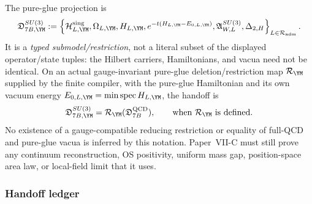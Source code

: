 \documentclass[12pt,a4paper]{article}
\begin{document}
\begin{definition}
\label{p11:def:pure-glue-wilson-curvature-subdatum-paper-xii}
The pure-glue projection is
\begin{equation}
\label{p11:eq:paper-xii-pure-glue-subdatum}
\mathfrak D_{7B,\YM}^{SU(3)}
:=\left\{\mathcal H_{L,\YM}^{\rm sing},\Omega_{L,\YM},H_{L,\YM},e^{-t(H_{L,\YM}-E_{0,L,\YM})},\mathfrak A_{W,L}^{SU(3)},\Delta_{2,H}\right\}_{L\in\mathcal R_{\rm adm}}.
\end{equation}
It is a \emph{typed submodel/restriction}, not a literal subset of the displayed
operator/state tuples: the Hilbert carriers, Hamiltonians, and vacua need not be identical. On an actual gauge-invariant pure-glue deletion/restriction map \(\mathcal R_{\YM}\) supplied by the finite compiler, with the pure-glue Hamiltonian and its own vacuum energy \(E_{0,L,\YM}=\min\operatorname{spec}H_{L,\YM}\), the handoff is
\begin{equation}
\label{p11:eq:pure-glue-subdatum-contained-in-full-qcd-export}
\mathfrak D_{7B,\YM}^{SU(3)}=\mathcal R_{\YM}(\mathfrak D_{7B}^{\rm QCD}),
\qquad \text{when }\mathcal R_{\YM}\text{ is defined}.
\end{equation}
No existence of a gauge-compatible reducing restriction or equality of full-QCD and pure-glue vacua is inferred by this notation.
Paper~VII-C must still prove any continuum reconstruction, OS positivity, uniform mass gap, position-space area law, or local-field limit that it uses.
\end{definition}


\subsubsection{Handoff ledger}
\label{p11:subsec:paper-xi-xii-handoff-ledger}
\end{document}
